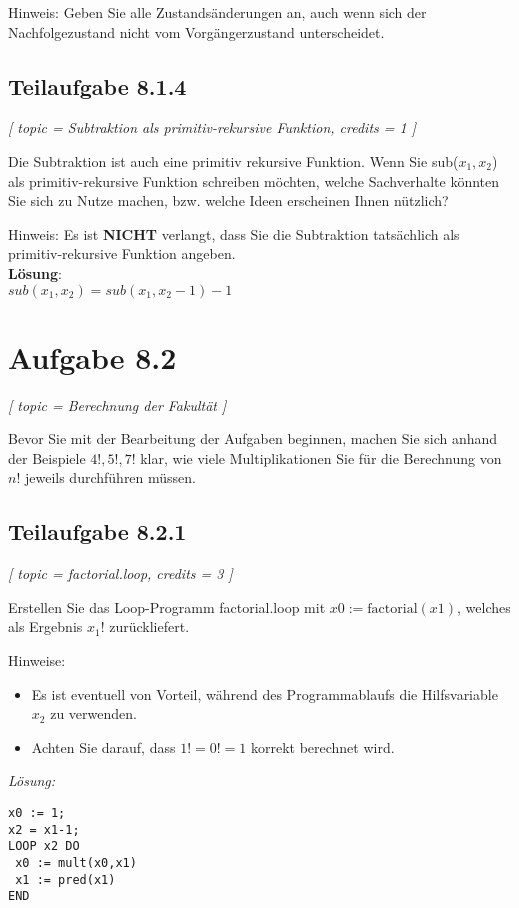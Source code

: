 \documentclass[12pt]{article}
\begin{document}
 Hinweis: Geben Sie alle Zustandsänderungen an, auch wenn sich der Nachfolgezustand nicht vom Vorgängerzustand unterscheidet. 
  
  
  
 \subsection*{Teilaufgabe 8.1.4} 
\textit{[ 
 topic = Subtraktion als primitiv-rekursive Funktion, 
 credits = 1 
 ] }
  
 Die Subtraktion ist auch eine primitiv rekursive Funktion. Wenn Sie sub($x_1,x_2$) als primitiv-rekursive Funktion schreiben möchten, welche Sachverhalte könnten Sie sich zu Nutze machen, bzw. welche Ideen erscheinen Ihnen nützlich? 
  
 Hinweis: Es ist \textbf{NICHT} verlangt, dass Sie die Subtraktion tatsächlich als primitiv-rekursive Funktion angeben. \\  \textbf{Lösung}:\\
 $sub(x_1,x_2)=sub(x_1,x_2-1)-1$
  

 \section*{Aufgabe 8.2} 
\textit{ [
 topic = Berechnung der Fakultät 
 ] }
  
 Bevor Sie mit der Bearbeitung der Aufgaben beginnen, machen Sie sich anhand der Beispiele $4!, 5!, 7!$ klar, wie viele Multiplikationen Sie für die Berechnung von $n!$ jeweils durchführen müssen.  
  
  
 \subsection*{Teilaufgabe 8.2.1} 
\textit{[ 
 topic = factorial.loop, 
 credits = 3 
 ] }
  
 Erstellen Sie das Loop-Programm factorial.loop mit $x0 := \text{factorial}(x1)$, welches als Ergebnis $x_1!$ zurückliefert. 
  
 Hinweise: 
 \begin{itemize} 
 \item Es ist eventuell von Vorteil, während des Programmablaufs die Hilfsvariable $x_2$ zu verwenden. 
 \item Achten Sie darauf, dass $1! = 0! = 1$ korrekt berechnet wird.  
 \end{itemize} 
\emph{  Lösung:}  
  \begin{lstlisting}[frame=single] 
x0 := 1;
x2 = x1-1;
LOOP x2 DO 
 x0 := mult(x0,x1)
 x1 := pred(x1)
END
\end{lstlisting}
  
\end{document}
